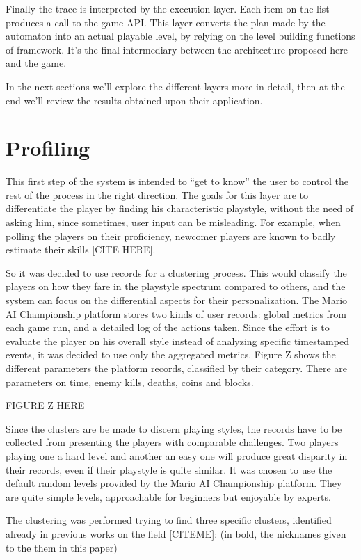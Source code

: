 \documentclass[conference]{IEEEtran}
\begin{document}
Finally the trace is interpreted by the execution layer. Each item on the list produces a call to the game API. This layer converts the plan made by the automaton into an actual playable level, by relying on the level building functions of framework. It's the final intermediary between the architecture proposed here and the game.

In the next sections we'll explore the different layers more in detail, then at the end we'll review the results obtained upon their application.

\section{Profiling}

This first step of the system is intended to ``get to know'' the user to control the rest of the process in the right direction. The goals for this layer are to differentiate the player by finding his characteristic playstyle, without the need of asking him, since sometimes, user input can be misleading. For example, when polling the players on their proficiency, newcomer players are known to badly estimate their skills [CITE HERE].

So it was decided to use records for a clustering process. This would classify the players on how they fare in the playstyle spectrum compared to others, and the system can focus on the differential aspects for their personalization. The Mario AI Championship platform stores two kinds of user records: global metrics from each game run, and a detailed log of the actions taken. Since the effort is to evaluate the player on his overall style instead of analyzing specific timestamped events, it was decided to use only the aggregated metrics. Figure Z shows the different parameters the platform records, classified by their category. There are parameters on time, enemy kills, deaths, coins and blocks.

FIGURE Z HERE

Since the clusters are be made to discern playing styles, the records have to be collected from presenting the players with comparable challenges. Two players playing one a hard level and another an easy one will produce great disparity in their records, even if their playstyle is quite similar. It was chosen to use the default random levels provided by the Mario AI Championship platform. They are quite simple levels, approachable for beginners but enjoyable by experts.

The clustering was performed trying to find three specific clusters, identified already in previous works on the field [CITEME]: (in bold, the nicknames given to the them in this paper)
\end{document}
